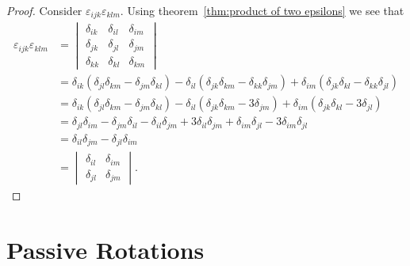 \documentclass[a4paper]{article}
\begin{document}
    \begin{proof}
        Consider \(\varepsilon_{ijk}\varepsilon_{klm}\).
        Using theorem~\ref{thm:product of two epsilons} we see that
        \begin{align*}
            \varepsilon_{ijk}\varepsilon_{klm} &= 
            \begin{vmatrix}
                \delta_{ik} & \delta_{il} & \delta_{im}\\
                \delta_{jk} & \delta_{jl} & \delta_{jm}\\
                \delta_{kk} & \delta_{kl} & \delta_{km}
            \end{vmatrix}
            \\
            &= \delta_{ik}(\delta_{jl}\delta_{km} - \delta_{jm}\delta_{kl})  - \delta_{il}(\delta_{jk}\delta_{km} - \delta_{kk}\delta_{jm}) + \delta_{im}(\delta_{jk}\delta_{kl} - \delta_{kk}\delta_{jl})\\
            &= \delta_{ik}(\delta_{jl}\delta_{km} - \delta_{jm}\delta_{kl})  - \delta_{il}(\delta_{jk}\delta_{km} - 3\delta_{jm}) + \delta_{im}(\delta_{jk}\delta_{kl} - 3\delta_{jl})\\
            &= \delta_{jl}\delta_{im} - \delta_{jm}\delta_{il} - \delta_{il}\delta_{jm} + 3\delta_{il}\delta_{jm} + \delta_{im}\delta_{jl} - 3\delta_{im}\delta_{jl}\\
            &= \delta_{il}\delta_{jm} - \delta_{jl}\delta_{im}\\
            &= 
            \begin{vmatrix}
                \delta_{il} & \delta_{im}\\
                \delta_{jl} & \delta_{jm}
            \end{vmatrix}
            .
        \end{align*}
    \end{proof}
    
    \section{Passive Rotations}
\end{document}
